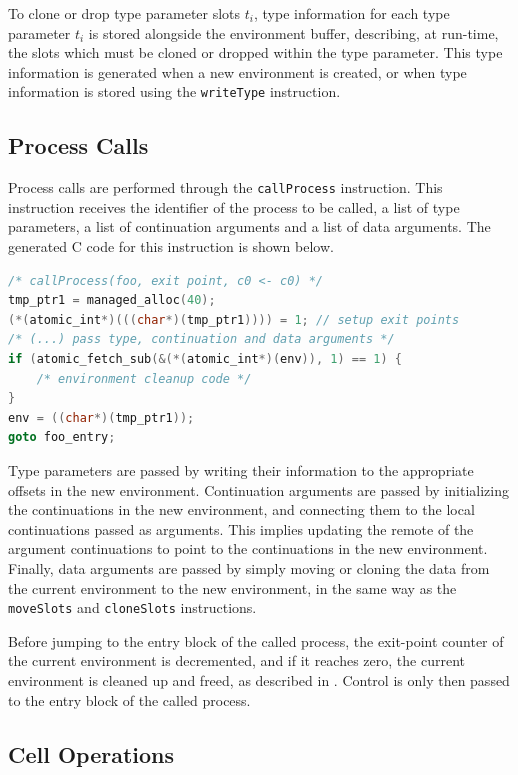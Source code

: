 To clone or drop type parameter slots $t_i$, type information for each type parameter $t_i$ is stored alongside the environment buffer, describing, at run-time, the slots which must be cloned or dropped within the type parameter. This type information is generated when a new environment is created, or when type information is stored using the \texttt{writeType} instruction.

\subsection{Process Calls}

Process calls are performed through the \texttt{callProcess} instruction. This instruction receives the identifier of the process to be called, a list of type parameters, a list of continuation arguments and a list of data arguments. The generated C code for this instruction is shown below.

\begin{lstlisting}[language=C, frame=bottom]
/* callProcess(foo, exit point, c0 <- c0) */
tmp_ptr1 = managed_alloc(40);
(*(atomic_int*)(((char*)(tmp_ptr1)))) = 1; // setup exit points
/* (...) pass type, continuation and data arguments */
if (atomic_fetch_sub(&(*(atomic_int*)(env)), 1) == 1) {
    /* environment cleanup code */
}
env = ((char*)(tmp_ptr1));
goto foo_entry;
\end{lstlisting}

Type parameters are passed by writing their information to the appropriate offsets in the new environment. Continuation arguments are passed by initializing the continuations in the new environment, and connecting them to the local continuations passed as arguments. This implies updating the remote of the argument continuations to point to the continuations in the new environment. Finally, data arguments are passed by simply moving or cloning the data from the current environment to the new environment, in the same way as the \texttt{moveSlots} and \texttt{cloneSlots} instructions.

Before jumping to the entry block of the called process, the exit-point counter of the current environment is decremented, and if it reaches zero, the current environment is cleaned up and freed, as described in . Control is only then passed to the entry block of the called process.

\subsection{Cell Operations}

